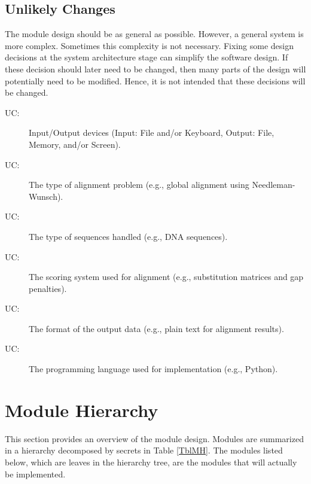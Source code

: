 \documentclass[12pt, titlepage]{article}
\newcounter{ucnum}
\newcommand{\uctheucnum}{UC\theucnum}
\begin{document}

\subsection{Unlikely Changes} \label{SecUchange}

The module design should be as general as possible. However, a general system is
more complex. Sometimes this complexity is not necessary. Fixing some design
decisions at the system architecture stage can simplify the software design. If
these decision should later need to be changed, then many parts of the design
will potentially need to be modified. Hence, it is not intended that these
decisions will be changed.

\begin{description}
  \item[ \uctheucnum \label{ucIO}:] Input/Output devices (Input: File and/or Keyboard, Output: File, Memory, and/or Screen).
  \item[ \uctheucnum \label{ucAlignmentType}:] The type of alignment problem (e.g., global alignment using Needleman-Wunsch).
  \item[ \uctheucnum \label{ucSequenceType}:] The type of sequences handled (e.g., DNA sequences).
  \item[ \uctheucnum \label{ucScoringSystem}:] The scoring system used for alignment (e.g., substitution matrices and gap penalties).
  \item[ \uctheucnum \label{ucOutputFormat}:] The format of the output data (e.g., plain text for alignment results).
  \item[ \uctheucnum \label{ucLanguage}:] The programming language used for implementation (e.g., Python).
\end{description}

\section{Module Hierarchy} \label{SecMH}

This section provides an overview of the module design. Modules are summarized
in a hierarchy decomposed by secrets in Table \ref{TblMH}. The modules listed
below, which are leaves in the hierarchy tree, are the modules that will
actually be implemented.
\end{document}
